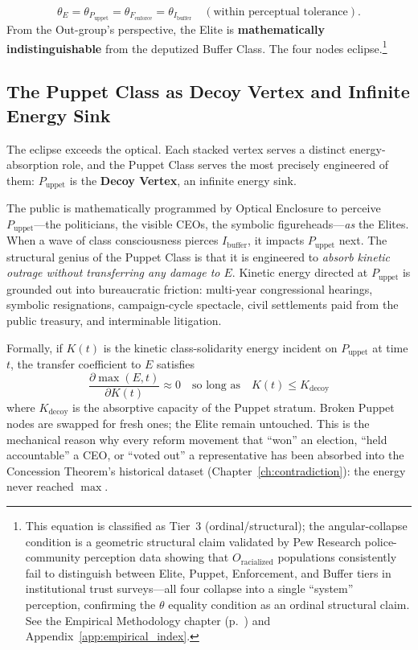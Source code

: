 \begin{equation}\label{eq:14.5-optical-enclosure}
\theta_{E} = \theta_{P_{\text{uppet}}} = \theta_{F_{\text{enforce}}} = \theta_{I_{\text{buffer}}} \quad (\text{within perceptual tolerance}).
\end{equation}
From the Out-group's perspective, the Elite is \textbf{mathematically indistinguishable} from the deputized Buffer Class. The four nodes eclipse.\footnote{This equation is classified as Tier~3 (ordinal/structural); the angular-collapse condition is a geometric structural claim validated by Pew Research police-community perception data showing that $O_{\text{racialized}}$ populations consistently fail to distinguish between Elite, Puppet, Enforcement, and Buffer tiers in institutional trust surveys---all four collapse into a single ``system'' perception, confirming the $\theta$ equality condition as an ordinal structural claim. See the Empirical Methodology chapter (p.~\pageref{ch:empirical_methodology}) and Appendix~\ref{app:empirical_index}.}

\subsection{The Puppet Class as Decoy Vertex and Infinite Energy Sink}

The eclipse exceeds the optical. Each stacked vertex serves a distinct energy-absorption role, and the Puppet Class serves the most precisely engineered of them: $P_{\text{uppet}}$ is the \textbf{Decoy Vertex}, an infinite energy sink. 

The public is mathematically programmed by Optical Enclosure to perceive $P_{\text{uppet}}$---the politicians, the visible CEOs, the symbolic figureheads---\textit{as} the Elites. When a wave of class consciousness pierces $I_{\text{buffer}}$, it impacts $P_{\text{uppet}}$ next. The structural genius of the Puppet Class is that it is engineered to \textit{absorb kinetic outrage without transferring any damage to $E$}. Kinetic energy directed at $P_{\text{uppet}}$ is grounded out into bureaucratic friction: multi-year congressional hearings, symbolic resignations, campaign-cycle spectacle, civil settlements paid from the public treasury, and interminable litigation. 

Formally, if $K(t)$ is the kinetic class-solidarity energy incident on $P_{\text{uppet}}$ at time $t$, the transfer coefficient to $E$ satisfies
\begin{equation}\label{eq:14.6-decoy-transfer-coefficient}
\frac{\partial \max(E, t)}{\partial K(t)} \approx 0 \quad \text{so long as} \quad K(t) \leq K_{\text{decoy}}
\end{equation}
where $K_{\text{decoy}}$ is the absorptive capacity of the Puppet stratum. Broken Puppet nodes are swapped for fresh ones; the Elite remain untouched. This is the mechanical reason why every reform movement that ``won'' an election, ``held accountable'' a CEO, or ``voted out'' a representative has been absorbed into the Concession Theorem's historical dataset (Chapter~\ref{ch:contradiction}): the energy never reached $\max$.

